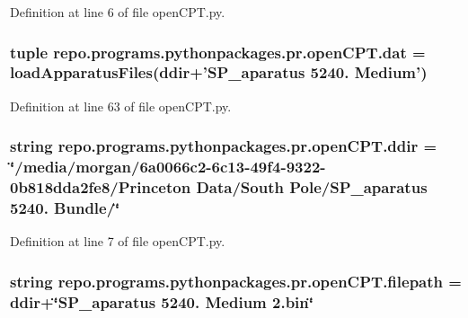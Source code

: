 Definition at line 6 of file open\-C\-P\-T.\-py.

\hypertarget{namespacerepo_1_1programs_1_1pythonpackages_1_1pr_1_1openCPT_a3e5077d300b3260fd9aa1487e0e15a3e}{
\subsubsection[{dat}]{\setlength{\rightskip}{0pt plus 5cm}tuple repo.\-programs.\-pythonpackages.\-pr.\-open\-C\-P\-T.\-dat = {\bf load\-Apparatus\-Files}({\bf ddir}+'S\-P\-\_\-aparatus 5240. Medium')}}\label{namespacerepo_1_1programs_1_1pythonpackages_1_1pr_1_1openCPT_a3e5077d300b3260fd9aa1487e0e15a3e}


Definition at line 63 of file open\-C\-P\-T.\-py.

\hypertarget{namespacerepo_1_1programs_1_1pythonpackages_1_1pr_1_1openCPT_a629d9addea1bbee10544941d7c301ba8}{
\subsubsection[{ddir}]{\setlength{\rightskip}{0pt plus 5cm}string repo.\-programs.\-pythonpackages.\-pr.\-open\-C\-P\-T.\-ddir = \char`\"{}/media/morgan/6a0066c2-\/6c13-\/49f4-\/9322-\/0b818dda2fe8/\-Princeton Data/\-South Pole/\-S\-P\-\_\-aparatus 5240. Bundle/\char`\"{}}}\label{namespacerepo_1_1programs_1_1pythonpackages_1_1pr_1_1openCPT_a629d9addea1bbee10544941d7c301ba8}


Definition at line 7 of file open\-C\-P\-T.\-py.

\hypertarget{namespacerepo_1_1programs_1_1pythonpackages_1_1pr_1_1openCPT_ad49f00cb69a927479558926f2158898f}{
\subsubsection[{filepath}]{\setlength{\rightskip}{0pt plus 5cm}string repo.\-programs.\-pythonpackages.\-pr.\-open\-C\-P\-T.\-filepath = {\bf ddir}+\char`\"{}S\-P\-\_\-aparatus 5240. Medium 2.bin\char`\"{}}}\label{namespacerepo_1_1programs_1_1pythonpackages_1_1pr_1_1openCPT_ad49f00cb69a927479558926f2158898f}


